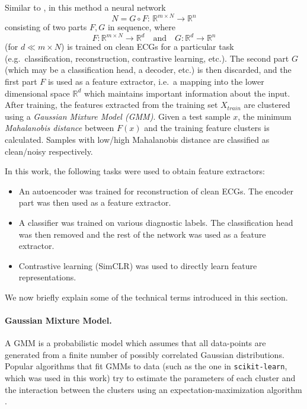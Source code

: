 \documentclass[a4paper,10pt]{article}
\newcommand{\R}{\mathbb{R}}
\begin{document}
Similar to \cite{featurespace}, in this method a neural network
\[
	N = G\circ F :\, \R^{m\times N} \to \R^n
\]
consisting of two parts $F,G$ in sequence, where
\[
	F: \R^{m\times N} \to \R^d \quad \mathrm{and} \quad G: \R^d \to \R^n
\]
(for $d \ll m\times N$) is trained on clean ECGs for a particular task (e.g.\ classification, reconstruction, contrastive learning, etc.). The second part $G$ (which may be a classification head, a decoder, etc.) is then discarded, and the first part $F$ is used as a feature extractor, i.e.\ a mapping into the lower dimensional space $\R^d$ which maintains important information about the input. After training, the features extracted from the training set $X_{train}$ are clustered using a \emph{Gaussian Mixture Model (GMM)}. Given a test sample $x$, the minimum \emph{Mahalanobis distance} between $F(x)$ and the training feature clusters is calculated. Samples with low/high Mahalanobis distance are classified as clean/noisy respectively.

In this work, the following tasks were used to obtain feature extractors:
\begin{itemize}
	\item An autoencoder was trained for reconstruction of clean ECGs. The encoder part was then used as a feature extractor.
	\item A classifier was trained on various diagnostic labels. The classification head was then removed and the rest of the network was used as a feature extractor.
	\item Contrastive learning (SimCLR) was used to directly learn feature representations.
\end{itemize}

We now briefly explain some of the technical terms introduced in this section.

\paragraph{Gaussian Mixture Model.} A GMM is a probabilistic model which assumes that all data-points are generated from a finite number of possibly correlated Gaussian distributions. Popular algorithms that fit GMMs to data (such as the one in \texttt{scikit-learn}, which was used in this work) try to estimate the parameters of each cluster and the interaction between the clusters using an expectation-maximization algorithm \cite{gmm}.
\end{document}
